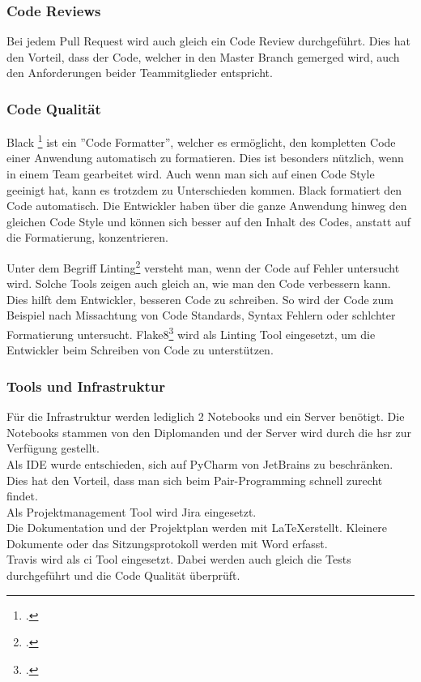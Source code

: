 \subsubsection*{Code Reviews}
Bei jedem Pull Request wird auch gleich ein Code Review durchgeführt. Dies hat den Vorteil, dass der Code, welcher in den Master Branch gemerged wird, auch den Anforderungen beider Teammitglieder entspricht.

\subsubsection*{Code Qualität}
Black \footcite{black} ist ein ''Code Formatter'', welcher es ermöglicht, den kompletten Code einer Anwendung automatisch zu formatieren. Dies ist besonders nützlich, wenn in einem Team gearbeitet wird. Auch wenn man sich auf einen Code Style geeinigt hat, kann es trotzdem zu Unterschieden kommen.
Black formatiert den Code automatisch. Die Entwickler haben über die ganze Anwendung hinweg den gleichen Code Style und können sich besser auf den Inhalt des Codes, anstatt auf die Formatierung, konzentrieren.\\

\newpage

Unter dem Begriff Linting\footcite{linting} versteht man, wenn der Code auf Fehler untersucht wird. Solche Tools zeigen auch gleich an, wie man den Code verbessern kann. Dies hilft dem Entwickler, besseren Code zu schreiben. So wird der Code zum Beispiel nach Missachtung von Code Standards, Syntax Fehlern oder schlchter Formatierung untersucht. Flake8\footcite{flake8} wird als Linting Tool eingesetzt, um die Entwickler beim Schreiben von Code zu unterstützen.

\subsubsection*{Tools und Infrastruktur}
Für die Infrastruktur werden lediglich 2 Notebooks und ein Server benötigt. Die Notebooks stammen von den Diplomanden und der Server wird durch die \gls{hsr} zur Verfügung gestellt. \\
Als IDE wurde entschieden, sich auf PyCharm von JetBrains zu beschränken. Dies hat den Vorteil, dass man sich beim Pair-Programming schnell zurecht findet. \\
Als Projektmanagement Tool wird Jira eingesetzt. \\
Die Dokumentation und der Projektplan werden mit \LaTeX erstellt. Kleinere Dokumente oder das Sitzungsprotokoll werden mit Word erfasst. \\
Travis wird als \gls{ci} Tool eingesetzt. Dabei werden auch gleich die Tests durchgeführt und die Code Qualität überprüft.




